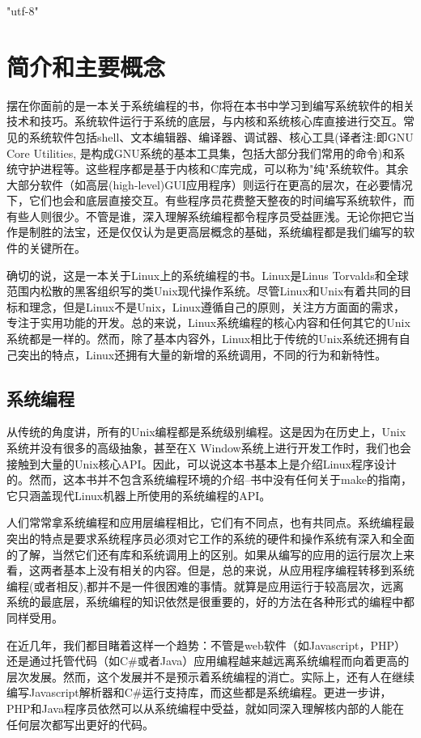 \ifx\atempxetex\usewhat 
\XeTeXinputencoding "utf-8"
\fi
{}

\chapter{简介和主要概念}

摆在你面前的是一本关于系统编程的书，你将在本书中学习到编写系统软件的相关技术和技巧。系统软件运行于系统的底层，与内核和系统核心库直接进行交互。常见的系统软件包括shell、文本编辑器、编译器、调试器、核心工具(译者注:即GNU Core Utilities, 是构成GNU系统的基本工具集，包括大部分我们常用的命令)和系统守护进程等。这些程序都是基于内核和C库完成，可以称为"纯"系统软件。其余大部分软件（如高层(high-level)GUI应用程序）则运行在更高的层次，在必要情况下，它们也会和底层直接交互。有些程序员花费整天整夜的时间编写系统软件，而有些人则很少。不管是谁，深入理解系统编程都令程序员受益匪浅。无论你把它当作是制胜的法宝，还是仅仅认为是更高层概念的基础，系统编程都是我们编写的软件的关键所在。


确切的说，这是一本关于Linux上的系统编程的书。Linux是Linus Torvalds和全球范围内松散的黑客组织写的类Unix现代操作系统。尽管Linux和Unix有着共同的目标和理念，但是Linux不是Unix，Linux遵循自己的原则，关注方方面面的需求，专注于实用功能的开发。总的来说，Linux系统编程的核心内容和任何其它的Unix系统都是一样的。然而，除了基本内容外，Linux相比于传统的Unix系统还拥有自己突出的特点，Linux还拥有大量的新增的系统调用，不同的行为和新特性。 

\section{系统编程}
从传统的角度讲，所有的Unix编程都是系统级别编程。这是因为在历史上，Unix系统并没有很多的高级抽象，甚至在X Window系统上进行开发工作时，我们也会接触到大量的Unix核心API。因此，可以说这本书基本上是介绍Linux程序设计的。然而，这本书并不包含系统编程环境的介绍--书中没有任何关于make的指南，它只涵盖现代Linux机器上所使用的系统编程的API。

人们常常拿系统编程和应用层编程相比，它们有不同点，也有共同点。系统编程最突出的特点是要求系统程序员必须对它工作的系统的硬件和操作系统有深入和全面的了解，当然它们还有库和系统调用上的区别。如果从编写的应用的运行层次上来看，这两者基本上没有相关的内容。但是，总的来说，从应用程序编程转移到系统编程(或者相反),都并不是一件很困难的事情。就算是应用运行于较高层次，远离系统的最底层，系统编程的知识依然是很重要的，好的方法在各种形式的编程中都同样受用。

在近几年，我们都目睹着这样一个趋势：不管是web软件（如Javascript，PHP）还是通过托管代码（如C\#或者Java）应用编程越来越远离系统编程而向着更高的层次发展。然而，这个发展并不是预示着系统编程的消亡。实际上，还有人在继续编写Javascript解析器和C\#运行支持库，而这些都是系统编程。更进一步讲，PHP和Java程序员依然可以从系统编程中受益，就如同深入理解核内部的人能在任何层次都写出更好的代码。

